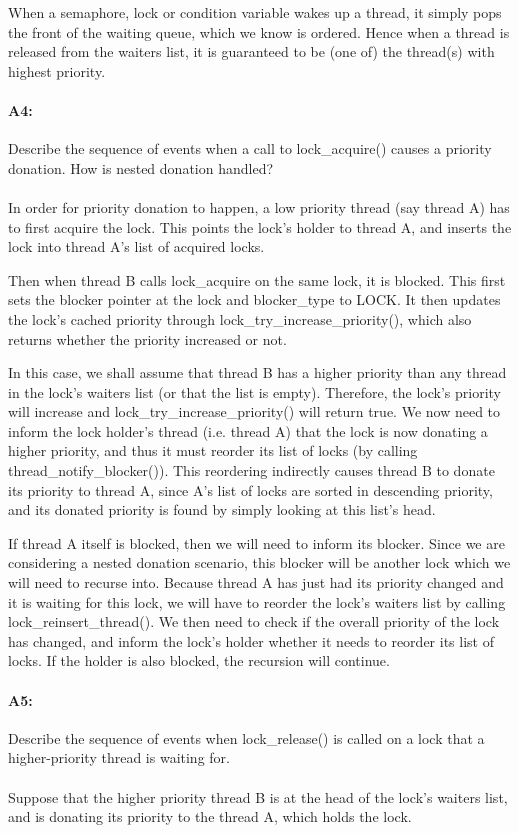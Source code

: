 When a semaphore, lock or condition variable wakes up a thread, it simply pops the front of the waiting queue, which we know is ordered. Hence when a thread is released from the waiters list, it is guaranteed to be (one of) the thread(s) with highest priority.

\paragraph{A4:} %
Describe the sequence of events when a call to lock\_acquire() causes a priority donation.  How is nested donation handled?
\\
\\
In order for priority donation to happen, a low priority thread (say thread A) has to first acquire the lock. This points the lock's holder to thread A, and inserts the lock into thread A's list of acquired locks.

Then when thread B calls lock\_acquire on the same lock, it is blocked. This first sets the blocker pointer at the lock and blocker\_type to LOCK. It then updates the lock's cached priority through lock\_try\_increase\_priority(), which also returns whether the priority increased or not.

In this case, we shall assume that thread B has a higher priority than any thread in the lock's waiters list (or that the list is empty). Therefore, the lock's priority will increase and lock\_try\_increase\_priority() will return true. We now need to inform the lock holder's thread (i.e. thread A) that the lock is now donating a higher priority, and thus it must reorder its list of locks (by calling thread\_notify\_blocker()). This reordering indirectly causes thread B to donate its priority to thread A, since A's list of locks are sorted in descending priority, and its donated priority is found by simply looking at this list's head.

If thread A itself is blocked, then we will need to inform its blocker. Since we are considering a nested donation scenario, this blocker will be another lock which we will need to recurse into. Because thread A has just had its priority changed and it is waiting for this lock, we will have to reorder the lock's waiters list by calling lock\_reinsert\_thread(). We then need to check if the overall priority of the lock has changed, and inform the lock's holder whether it needs to reorder its list of locks. If the holder is also blocked, the recursion will continue.

\paragraph{A5:} %
Describe the sequence of events when lock\_release() is called on a lock that a higher-priority thread is waiting for.
\\
\\
Suppose that the higher priority thread B is at the head of the lock's waiters list, and is donating its priority to the thread A, which holds the lock.

